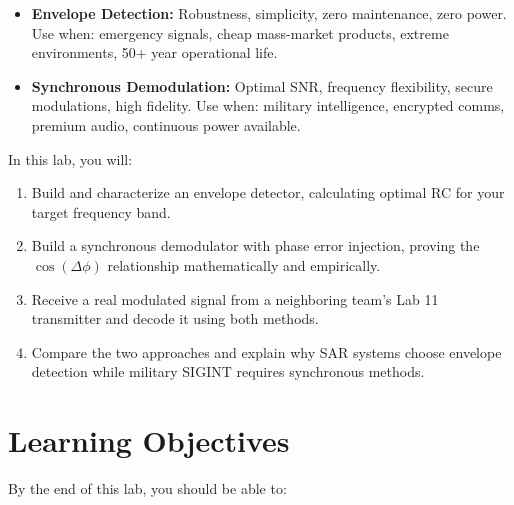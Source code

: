 \documentclass[11pt,letterpaper]{article}
\begin{document}
\begin{itemize}
    \item \textbf{Envelope Detection:} Robustness, simplicity, zero maintenance, zero power. Use when: emergency signals, cheap mass-market products, extreme environments, 50+ year operational life.
    \item \textbf{Synchronous Demodulation:} Optimal SNR, frequency flexibility, secure modulations, high fidelity. Use when: military intelligence, encrypted comms, premium audio, continuous power available.
\end{itemize}

\noindent
In this lab, you will:

\begin{enumerate}
    \item Build and characterize an envelope detector, calculating optimal RC for your target frequency band.
    \item Build a synchronous demodulator with phase error injection, proving the $\cos(\Delta \phi)$ relationship mathematically and empirically.
    \item Receive a real modulated signal from a neighboring team's Lab 11 transmitter and decode it using both methods.
    \item Compare the two approaches and explain why SAR systems choose envelope detection while military SIGINT requires synchronous methods.
\end{enumerate}

\clearpage

\section{Learning Objectives}

By the end of this lab, you should be able to:
\end{document}
